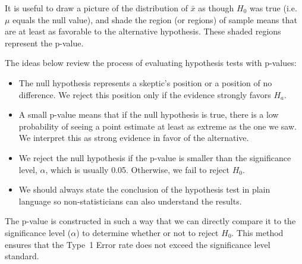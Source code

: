 
\begin{tipBox}{
It is useful to draw a picture of the distribution of $\bar{x}$ as though $H_0$ was true (i.e. $\mu$ equals the null value), and shade the region (or regions) of sample means that are at least as favorable to the alternative hypothesis. These shaded regions represent the p-value.}
\end{tipBox}

The ideas below review the process of evaluating hypothesis tests with p-values:
\begin{itemize}
\setlength{\itemsep}{0mm}
\item The null hypothesis represents a skeptic's position or a position of no difference. We reject this position only if the evidence strongly favors $H_a$.
\item A small p-value means that if the null hypothesis is true, there is a low probability of seeing a point estimate at least as extreme as the one we saw. We interpret this as strong evidence in favor of the alternative.
\item We reject the null hypothesis if the p-value is smaller than the significance level, $\alpha$, which is usually 0.05. Otherwise, we fail to reject $H_0$.
\item We should always state the conclusion of the hypothesis test in plain language so non-statisticians can also understand the results.
\end{itemize}

The p-value is constructed in such a way that we can directly compare it to the significance level ($\alpha$) to determine whether or not to reject $H_0$. This method ensures that the Type~1 Error rate does not exceed the significance level standard. 












\vfill












